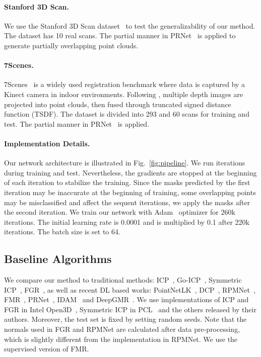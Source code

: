 \documentclass[10pt,twocolumn,letterpaper]{article}
\begin{document}
\vspace{-0.50cm}
\paragraph{Stanford 3D Scan.}
We use the Stanford 3D Scan dataset~\cite{curless1996volumetric} to test the generalizability of our method. The dataset has 10 real scans. The partial manner in PRNet~\cite{wang2019prnet} is applied to generate partially overlapping point clouds.

\vspace{-0.50cm}
\paragraph{7Scenes.}
7Scenes~\cite{shotton2013scene} is a widely used registration benchmark where data is captured by a Kinect camera in indoor environments. Following \cite{zeng20173dmatch, huang2020feature}, multiple depth images are projected into point clouds, then fused through truncated signed distance function (TSDF). The dataset is divided into 293 and 60 scans for training and test. The partial manner in PRNet~\cite{wang2019prnet} is applied.

\vspace{-0.50cm}
\paragraph{Implementation Details.}
Our network architecture is illustrated in Fig.~\ref{fig:pipeline}. We run  iterations during training and test. Nevertheless, the  gradients are stopped at the beginning of each iteration to stabilize the training. Since the masks predicted by the first iteration may be inaccurate at the beginning of training, some overlapping points may be misclassified and affect the sequent iterations, we apply the masks after the second iteration. We train our network with Adam~\cite{kingma2014adam} optimizer for 260k iterations. The initial learning rate is 0.0001 and is multiplied by 0.1 after 220k iterations. The batch size is set to 64. 


\subsection{Baseline Algorithms} \label{sec:4.2}
We compare our method to traditional methods: ICP~\cite{besl1992method}, Go-ICP~\cite{yang2013go}, Symmetric ICP~\cite{rusinkiewicz2019symmetric}, FGR~\cite{zhou2016fast}, as well as recent DL based works: PointNetLK~\cite{aoki2019pointnetlk}, DCP~\cite{wang2019deep}, RPMNet~\cite{yew2020-RPMNet}, FMR~\cite{huang2020feature}, PRNet~\cite{wang2019prnet}, IDAM~\cite{idam} and DeepGMR~\cite{yuan2020deepgmr}. We use implementations of ICP and FGR in Intel Open3D~\cite{zhou2018open3d}, Symmetric ICP in PCL~\cite{Rusu_ICRA2011_PCL} and the others released by their authors. Moreover, the test set is fixed by setting random seeds. Note that the normals used in FGR and RPMNet are calculated after data pre-processing, which is slightly different from the implementation in RPMNet. We use the supervised version of FMR.
\end{document}
